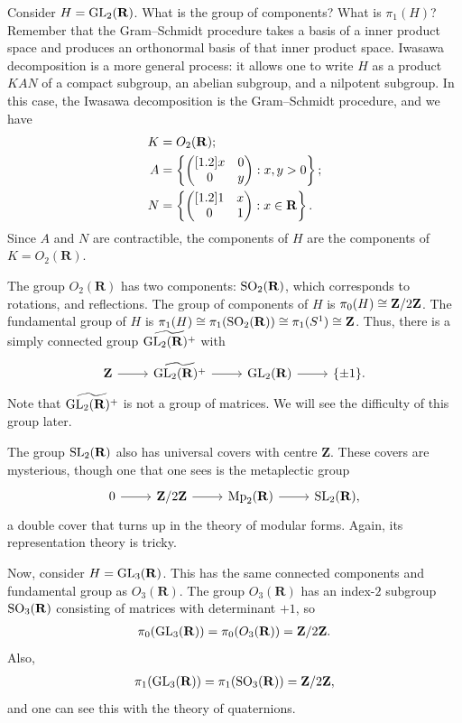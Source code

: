 \documentclass [11 pt, twoside] {article}
\begin{document}
\begin{example}[ ]\label{}\text{}
Consider $H=\operatorname{GL}_{2}(\mathbf{R})$. What is the group of components? What is $\pi_1(H)$?
Remember that the Gram--Schmidt procedure takes a basis of a inner product space and produces an orthonormal basis of that inner product space.
Iwasawa decomposition is a more general process: it allows one to write $H$ as a product $KAN$ of a compact subgroup, an abelian subgroup, and a nilpotent subgroup. 
In this case, the Iwasawa decomposition is the Gram--Schmidt procedure, and we have
\begin{align*}
	K &= O_{2}(\mathbf{R}) ;\\
	A &= \left\{ \begin{pmatrix} [1.2] x&0\\0&y\end{pmatrix} : x,y>0 \right\};\\
	N &= \left\{ \begin{pmatrix} [1.2] 1&x\\0&1\end{pmatrix} : x\in \mathbf{R} \right\} . 
\end{align*}
Since $A$ and $N$ are contractible, the components of $H$ are the components of $K = O_{2}(\mathbf{R})$.

The group $O_{2}(\mathbf{R})$ has two components: $\operatorname{SO}_{2}(\mathbf{R})$, which corresponds to rotations, and reflections.
The group of components of $H$ is $\pi_0(H)\cong  \mathbf{Z}/2\mathbf{Z}$.
The fundamental group of $H$ is $\pi_1(H)\cong \pi_1(\operatorname{SO}_{2}(\mathbf{R})) \cong \pi_1(S^{1}) \cong \mathbf{Z}$.
Thus, there is a simply connected group $\widetilde{\operatorname{GL}_{2}(\mathbf{R}) ^{+}}$ with
\[
\begin{tikzcd}
	\mathbf{Z}\ar[r]& \widetilde{\GL_{2}(\mathbf{R}) ^{+}} \ar[r]& \GL_{2}(\mathbf{R})\ar[r]& \{\pm 1\}.
\end{tikzcd}
\]
Note that $\widetilde{\operatorname{GL}_{2}(\mathbf{R}) ^{+}}$ is not a group of matrices.
We will see the difficulty of this group later.

The group $\operatorname{SL}_{2}(\mathbf{R})$ also has universal covers with centre $\mathbf{Z}$. These covers are mysterious, though one that one sees is the metaplectic group
\[
\begin{tikzcd}
	0\ar[r]& \mathbf{Z}/2\mathbf{Z}\ar[r]& \Mp_{2}(\mathbf{R})\ar[r]& \SL_{2}(\mathbf{R}),
\end{tikzcd}
\]
a double cover that turns up in the theory of modular forms.
Again, its representation theory is tricky. 
\end{example}

\begin{example}[ ]\label{}\text{}
Now, consider $H=\operatorname{GL}_{3}(\mathbf{R})$. This has the same connected components and fundamental group as $O_3(\mathbf{R})$.
The group $O_{3}(\mathbf{R})$ has an index-$2$ subgroup $\operatorname{SO}_{3}(\mathbf{R})$ consisting of matrices with determinant $+1$, so
\begin{align*}
	\pi_0(\operatorname{GL}_{3}(\mathbf{R})) = \pi_{0}(O_{3}(\mathbf{R})) = \mathbf{Z}/2\mathbf{Z}.
\end{align*}
Also,
\begin{align*}
	\pi_1(\operatorname{GL}_{3}(\mathbf{R})) = \pi_1(\operatorname{SO}_{3}(\mathbf{R})) = \mathbf{Z}/2\mathbf{Z}, 
\end{align*}
and one can see this with the theory of quaternions.
\end{example}
\end{document}
